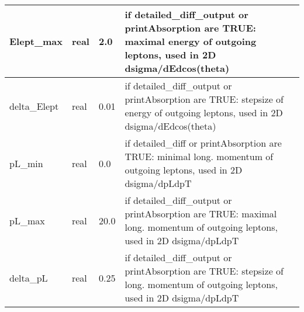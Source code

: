 \documentclass{article}
\begin{document}
\begin{longtable}{llll}
\midrule
Elept\_max & \begin{minipage}[t]{2cm}real\end{minipage} & \begin{minipage}[t]{2cm}2.0\end{minipage} & \begin{minipage}[t]{12cm}if detailed\_diff\_output or printAbsorption are TRUE: maximal energy of outgoing leptons, used in 2D dsigma/dEdcos(theta)\end{minipage}\\*
\midrule
delta\_Elept & \begin{minipage}[t]{2cm}real\end{minipage} & \begin{minipage}[t]{2cm}0.01\end{minipage} & \begin{minipage}[t]{12cm}if detailed\_diff\_output or printAbsorption are TRUE: stepsize of energy of outgoing leptons, used in 2D dsigma/dEdcos(theta)\end{minipage}\\*
\midrule
pL\_min & \begin{minipage}[t]{2cm}real\end{minipage} & \begin{minipage}[t]{2cm}0.0\end{minipage} & \begin{minipage}[t]{12cm}if detailed\_diff or printAbsorption are TRUE: minimal long. momentum  of outgoing leptons, used in 2D dsigma/dpLdpT\end{minipage}\\*
\midrule
pL\_max & \begin{minipage}[t]{2cm}real\end{minipage} & \begin{minipage}[t]{2cm}20.0\end{minipage} & \begin{minipage}[t]{12cm}if detailed\_diff\_output or printAbsorption are TRUE: maximal long. momentum  of outgoing leptons, used in 2D dsigma/dpLdpT\end{minipage}\\*
\midrule
delta\_pL & \begin{minipage}[t]{2cm}real\end{minipage} & \begin{minipage}[t]{2cm}0.25\end{minipage} & \begin{minipage}[t]{12cm}if detailed\_diff\_output or printAbsorption are TRUE: stepsize of long. momentum of outgoing leptons, used in 2D dsigma/dpLdpT\end{minipage}\\*

\end{longtable}
\end{document}
